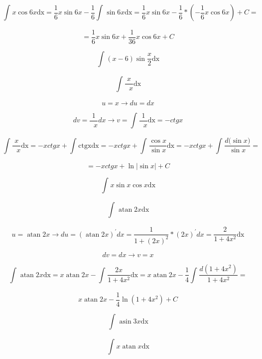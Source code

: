 \documentclass[]{article}
\begin{document}
\[\int_{}^{}{x\cos{6x}\text{dx}} = \frac{1}{6}x\sin{6x} - \frac{1}{6}\int_{}^{}{\sin{6x}\text{dx}} = \frac{1}{6}x\sin{6x} - \frac{1}{6} * ( - \frac{1}{6}x\cos{6x} ) + C =\]

\[= \frac{1}{6}x\sin{6x} + \frac{1}{36}x\cos{6x} + C\]

\[\int_{}^{}{(x - 6)\sin\frac{x}{2}\text{dx}}\]

\[\int_{}^{}{\frac{x}{\operatorname{}x}\text{dx}}\]

\[u = x \rightarrow du = dx\]

\[dv = \frac{1}{\operatorname{}x}dx \rightarrow v = \int_{}^{}{\frac{1}{\operatorname{}x}\text{dx}} = - ctgx\]

\[\int_{}^{}{\frac{x}{\operatorname{}x}\text{dx}} = - xctgx + \int_{}^{}{\text{ctgx}\text{dx}} = - xctgx + \int_{}^{}{\frac{\cos x}{\sin x}\text{dx}} = - xctgx + \int_{}^{}\frac{d(\sin{x)}}{\sin x} =\]

\[= - xctgx + \ln\left| \sin x \right| + C\]

\[\int_{}^{}{x\sin x\cos x\text{dx}}\]

\[\int_{}^{}{\operatorname{atan}{2x}\text{dx}}\]

\[u = \operatorname{atan}{2x} \rightarrow du = ( \operatorname{atan}{2x} )^{'}dx = \frac{1}{1 + ( 2x )^{2}} * ( 2x )^{'}dx = \frac{2}{1 + 4x^{2}}\text{dx}\]

\[dv = dx \rightarrow v = x\]

\[\int_{}^{}{\operatorname{atan}{2x}\text{dx}} = x\operatorname{atan}{2x} - \int_{}^{}{\frac{2x}{1 + 4x^{2}}\text{dx}} = x\operatorname{atan}{2x} - \frac{1}{4}\int_{}^{}\frac{d( 1 + 4x^{2} )}{1 + 4x^{2}} =\]

\[x\operatorname{atan}{2x} - \frac{1}{4}\ln( 1 + 4x^{2} ) + C\]

\[\int_{}^{}{\operatorname{asin}{3x}\text{dx}}\]

\[\int_{}^{}{x\operatorname{atan}x\text{dx}}\]
\end{document}
